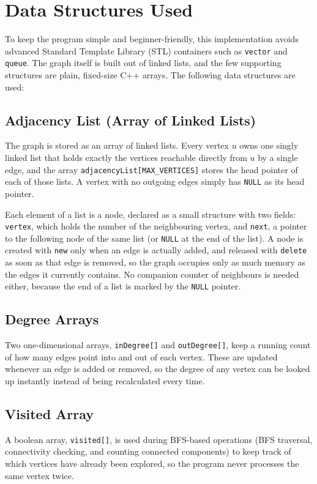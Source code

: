 \documentclass[11pt]{article}
\begin{document}
\section{Data Structures Used}

To keep the program simple and beginner-friendly, this implementation avoids advanced Standard Template Library (STL) containers such as \texttt{vector} and \texttt{queue}. The graph itself is built out of linked lists, and the few supporting structures are plain, fixed-size C++ arrays. The following data structures are used:

\subsection*{Adjacency List (Array of Linked Lists)}
The graph is stored as an array of linked lists. Every vertex $u$ owns one singly linked list that holds exactly the vertices reachable directly from $u$ by a single edge, and the array \texttt{adjacencyList[MAX\_VERTICES]} stores the head pointer of each of those lists. A vertex with no outgoing edges simply has \texttt{NULL} as its head pointer.

Each element of a list is a node, declared as a small structure with two fields: \texttt{vertex}, which holds the number of the neighbouring vertex, and \texttt{next}, a pointer to the following node of the same list (or \texttt{NULL} at the end of the list). A node is created with \texttt{new} only when an edge is actually added, and released with \texttt{delete} as soon as that edge is removed, so the graph occupies only as much memory as the edges it currently contains. No companion counter of neighbours is needed either, because the end of a list is marked by the \texttt{NULL} pointer.

\subsection*{Degree Arrays}
Two one-dimensional arrays, \texttt{inDegree[]} and \texttt{outDegree[]}, keep a running count of how many edges point into and out of each vertex. These are updated whenever an edge is added or removed, so the degree of any vertex can be looked up instantly instead of being recalculated every time.

\subsection*{Visited Array}
A boolean array, \texttt{visited[]}, is used during BFS-based operations (BFS traversal, connectivity checking, and counting connected components) to keep track of which vertices have already been explored, so the program never processes the same vertex twice.
\end{document}
